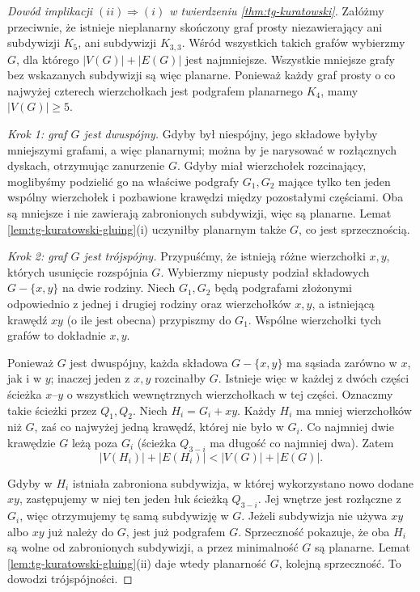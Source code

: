 \begin{proof}[Dowód implikacji
\texorpdfstring{$(ii)\Rightarrow(i)$}{(ii) => (i)}
w twierdzeniu \ref{thm:tg-kuratowski}]
Załóżmy przeciwnie, że
istnieje nieplanarny
skończony graf prosty
niezawierający ani
subdywizji $K_5$, ani
subdywizji $K_{3,3}$.
Wśród wszystkich takich
grafów wybierzmy $G$,
dla którego
$|V(G)|+|E(G)|$
jest najmniejsze.
Wszystkie mniejsze
grafy bez wskazanych
subdywizji są więc
planarne. Ponieważ
każdy graf prosty
o co najwyżej czterech
wierzchołkach jest
podgrafem planarnego $K_4$,
mamy $|V(G)|\geq5$.

\emph{Krok 1: graf $G$
jest dwuspójny.}
Gdyby był niespójny,
jego składowe byłyby
mniejszymi grafami,
a więc planarnymi;
można by je narysować
w rozłącznych dyskach,
otrzymując zanurzenie $G$.
Gdyby miał wierzchołek
rozcinający, moglibyśmy
podzielić go na właściwe
podgrafy $G_1,G_2$
mające tylko ten jeden
wspólny wierzchołek
i pozbawione krawędzi
między pozostałymi
częściami. Oba są
mniejsze i nie
zawierają zabronionych
subdywizji, więc
są planarne.
Lemat
\ref{lem:tg-kuratowski-gluing}(i)
uczyniłby planarnym
także $G$,
co jest sprzecznością.

\emph{Krok 2: graf $G$
jest trójspójny.}
Przypuśćmy, że
istnieją różne
wierzchołki $x,y$,
których usunięcie
rozspójnia $G$.
Wybierzmy niepusty
podział składowych
$G-\{x,y\}$ na dwie
rodziny. Niech
$G_1,G_2$ będą
podgrafami złożonymi
odpowiednio z jednej
i drugiej rodziny
oraz wierzchołków
$x,y$, a istniejącą
krawędź $xy$ (o ile
jest obecna)
przypiszmy do $G_1$.
Wspólne wierzchołki
tych grafów to
dokładnie $x,y$.

Ponieważ $G$ jest
dwuspójny, każda
składowa $G-\{x,y\}$
ma sąsiada zarówno
w $x$, jak i w $y$;
inaczej jeden z
$x,y$ rozcinałby $G$.
Istnieje więc
w każdej z dwóch
części ścieżka
$x$--$y$ o wszystkich
wewnętrznych
wierzchołkach
w tej części.
Oznaczmy takie
ścieżki przez $Q_1,Q_2$.
Niech $H_i=G_i+xy$.
Każdy $H_i$ ma
mniej wierzchołków
niż $G$, zaś
co najwyżej jedną
krawędź, której
nie było w $G_i$.
Co najmniej dwie
krawędzie $G$
leżą poza $G_i$
(ścieżka $Q_{3-i}$
ma długość co
najmniej dwa).
Zatem
\[
|V(H_i)|+|E(H_i)|
<|V(G)|+|E(G)|.
\]

Gdyby w $H_i$
istniała zabroniona
subdywizja, w której
wykorzystano nowo
dodane $xy$, zastępujemy
w niej ten jeden
łuk ścieżką
$Q_{3-i}$. Jej
wnętrze jest rozłączne
z $G_i$, więc
otrzymujemy tę samą
subdywizję w $G$.
Jeżeli subdywizja
nie używa $xy$ albo
$xy$ już należy do
$G$, jest już
podgrafem $G$.
Sprzeczność
pokazuje, że
oba $H_i$ są
wolne od zabronionych
subdywizji, a przez
minimalność $G$
są planarne.
Lemat
\ref{lem:tg-kuratowski-gluing}(ii)
daje wtedy
planarność $G$,
kolejną sprzeczność.
To dowodzi trójspójności.


\end{proof}
